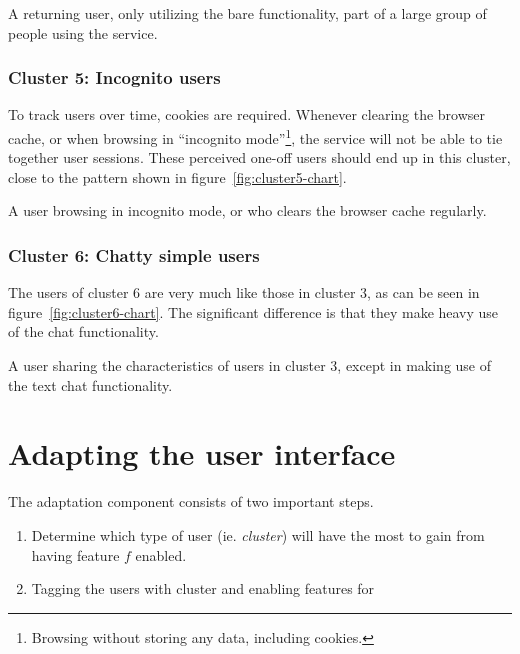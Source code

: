 \begin{persona}
  A returning user, only utilizing the bare functionality, part of a large group of people using the service.
\end{persona}

\subsubsection{Cluster 5: Incognito users}

To track users over time, cookies are required. Whenever clearing the browser cache, or when browsing in ``incognito mode''\footnote{Browsing without storing any data, including cookies.}, the service will not be able to tie together user sessions. These perceived one-off users should end up in this cluster, close to the pattern shown in figure~\ref{fig:cluster5-chart}.

\begin{persona}
  A user browsing in incognito mode, or who clears the browser cache regularly.
\end{persona}

\subsubsection{Cluster 6: Chatty simple users}

The users of cluster 6 are very much like those in cluster 3, as can be seen in figure~\ref{fig:cluster6-chart}. The significant difference is that they make heavy use of the chat functionality.

\begin{persona}
  A user sharing the characteristics of users in cluster 3, except in making use of the text chat functionality.
\end{persona}

\section{Adapting the user interface} %
\label{eval:sec:adapting_the_user_interface}

The adaptation component consists of two important steps.

\begin{enumerate}
  \item Determine which type of user (ie. \emph{cluster}) will have the most to gain from having feature $f$ enabled.
  \item Tagging the users with cluster and enabling features for
\end{enumerate}


